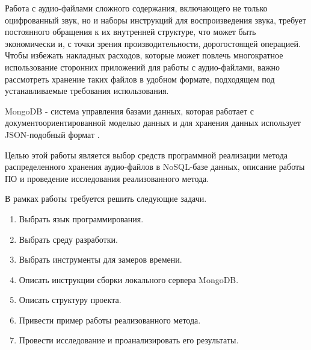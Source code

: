 \Introduction
Работа с аудио-файлами сложного содержания, включающего не только оцифрованный звук, но и наборы инструкций для воспроизведения звука, требует постоянного обращения к их внутренней структуре, что может быть экономически и, с точки зрения производительности, дорогостоящей операцией. Чтобы избежать накладных расходов, которые может повлечь многократное использование сторонних приложений для работы с аудио-файлами, важно рассмотреть хранение таких файлов в удобном формате, подходящем под устанавливаемые требования использования.

MongoDB - система управления базами данных, которая работает с документоориентированной моделью данных и для хранения данных использует JSON-подобный формат \cite{Mongo}.

Целью этой работы является выбор средств программной реализации метода
распределенного хранения аудио-файлов в NoSQL-базе данных, описание работы ПО и проведение исследования реализованного метода.

В рамках работы требуется решить следующие задачи.
\begin{enumerate}
\item Выбрать язык программирования.
\item Выбрать среду разработки.
\item Выбрать инструменты для замеров времени.
\item Описать инструкции сборки локального сервера MongoDB.
\item Описать структуру проекта.
\item Привести пример работы реализованного метода.
\item Провести исследование и проанализировать его результаты.
\end{enumerate}
